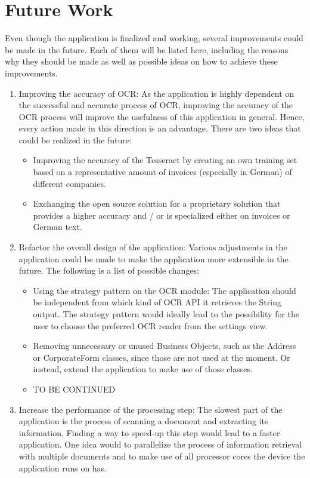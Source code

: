 \section{Future Work}
\label{sec6.2}
Even though the application is finalized and working, several improvements could be made in the future.
Each of them will be listed here, including the reasons why they should be made as well as possible ideas on how to achieve these improvements.
\begin{enumerate}
	\item Improving the accuracy of OCR: As the application is highly dependent on the successful and accurate process of OCR, improving the accuracy of the OCR process will improve the usefulness of this application in general. Hence, every action made in this direction is an advantage. There are two ideas that could be realized in the future: 
	\begin{itemize}
		\item Improving the accuracy of the Tesseract by creating an own training set based on a representative amount of invoices (especially in German) of different companies.
		\item Exchanging the open source solution for a proprietary solution that provides a higher accuracy and / or is specialized either on invoices or German text.
	\end{itemize}
	\item Refactor the overall design of the application: Various adjustments in the application could be made to make the application more extensible in the future. The following is a list of possible changes:
	\begin{itemize}
		\item Using the strategy pattern on the OCR module: The application should be independent from which kind of OCR API it retrieves the String output. The strategy pattern would ideally lead to the possibility for the user to choose the preferred OCR reader from the settings view.
		\item Removing unnecessary or unused Business Objects, such as the Address or CorporateForm classes, since those are not used at the moment. Or instead, extend the application to make use of those classes.
		\item TO BE CONTINUED %
	\end{itemize}
	\item Increase the performance of the processing step: The slowest part of the application is the process of scanning a document and extracting its information. Finding a way to speed-up this step would lead to a faster application. One idea would to parallelize the process of information retrieval with multiple documents and to make use of all processor cores the device the application runs on has.

\end{enumerate}
